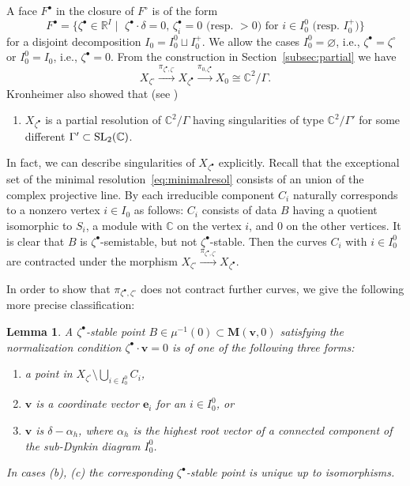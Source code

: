 \documentclass[pdftex]{sigma}
\newenvironment{aenume}{%
  \begin{enumerate}%
  \renewcommand{\theenumi}{\alph{enumi}}%
  \renewcommand{\labelenumi}{\textup{(\theenumi)}}%
  }{\end{enumerate}}
\newtheorem{Lemma}[equation]{Lemma}
\theoremstyle{definition}
\numberwithin{equation}{section}
\newcommand{\subsecref}[1]{Section~\ref{#1}}
\newcommand{\C}{{\mathbb C}}
\newcommand{\R}{{\mathbb R}}
\newcommand{\SL}{\operatorname{\rm SL}}
\newcommand{\bM}{{\mathbf M}} %
\newcommand{\bv}{{\mathbf v}} %
\newcommand{\be}{{\mathbf e}}
\begin{document}
A face $F^\bullet$ in the closure of $F^\circ$ is of the form
\begin{equation*}
    F^\bullet = \{ \zeta^\bullet\in \R^I \mid \text{
     $\zeta^\bullet\cdot \delta = 0$,
     $\zeta^\bullet_i = 0$ (resp.\ $> 0$) for
    $i \in I_0^0$ (resp.\ $I_0^+$)}\}
\end{equation*}
for a disjoint decomposition $I_0 = I_0^0 \sqcup I_0^+$.
%
We allow the cases $I_0^0 = \varnothing$, i.e., $\zeta^\bullet =
\zeta^\circ$ or $I_0^0=I_0$, i.e., $\zeta^\bullet = 0$.
%
From the construction in \subsecref{subsec:partial} we have
\begin{equation*}
  X_{\zeta^\circ} \xrightarrow{\pi_{\zeta^\bullet,\zeta^\circ}}
  X_{\zeta^\bullet}\xrightarrow{\pi_{0,\zeta^\bullet}}
  X_0 \cong \C^2/\Gamma.
\end{equation*}
Kronheimer also showed that (see \cite[Lemma~3.3]{Kr})
\begin{aenume}\itemsep=0pt
\setcounter{enumi}{2}
\item $X_{\zeta^\bullet}$ is a partial resolution of $\C^2/\Gamma$
  having singularities of type $\C^2/\Gamma'$ for some dif\/ferent
  $\Gamma'\subset\SL_2(\C)$.
\end{aenume}

In fact, we can describe singularities of $X_{\zeta^\bullet}$
explicitly. Recall that the exceptional set of the minimal resolution~\eqref{eq:minimalresol} consists of an union of the complex projective
line. By \cite{Na-proc} each irreducible component $C_i$ naturally
corresponds to a nonzero vertex $i\in I_0$ as follows: $C_i$ consists
of data $B$ having a quotient isomorphic to $S_i$, a module with $\C$
on the vertex $i$, and $0$ on the other vertices.
%
It is clear that $B$ is $\zeta^\bullet$-semistable, but not
$\zeta^\bullet$-stable.
%
Then the curves $C_i$ with $i\in I_0^0$ are contracted under the
morphism
\(
   X_{\zeta^\circ}
   \xrightarrow{\pi_{\zeta^\bullet,\zeta^\circ}} X_{\zeta^\bullet}.
\)

In order to show that $\pi_{\zeta^\bullet,\zeta^\circ}$ does not
contract further curves, we give the following more precise
classif\/ication:

\begin{Lemma}\label{lem:bulletstable}
  A $\zeta^\bullet$-stable point $B\in\mu^{-1}(0)\subset\bM(\bv,0)$
  satisfying the normalization condition $\zeta^\bullet\cdot\bv = 0$
  is of one of the following three forms\textup:
  \begin{aenume}\itemsep=0pt
  \item a point in $X_{\zeta^\circ}\setminus \bigcup_{i\in I_0^0}
    C_i$,
  \item $\bv$ is a coordinate vector $\be_i$ for an $i\in
    I_0^0$, or
  \item $\bv$ is $\delta - \alpha_h$, where $\alpha_h$ is the highest
    root vector of a connected component of the sub-Dynkin diagram
    $I_0^0$.
  \end{aenume}
  In cases \textup{(b)}, \textup{(c)} the corresponding
  $\zeta^\bullet$-stable point is unique up to isomorphisms.
\end{Lemma}
\end{document}
